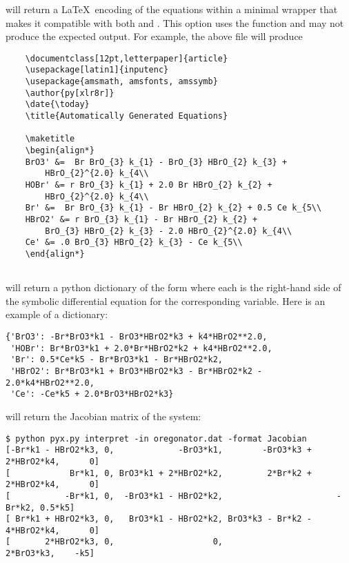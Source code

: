  will return a \LaTeX\ encoding of the equations within a minimal wrapper that makes it compatible with both  and . 
This option uses the  function and may not produce the expected output. 
For example, the above file will produce

\begin{lstlisting}
	\documentclass[12pt,letterpaper]{article}
	\usepackage[latin1]{inputenc}
	\usepackage{amsmath, amsfonts, amssymb}
	\author{py[xlr8r]}
	\date{\today}
	\title{Automatically Generated Equations}
	
	\maketitle
	\begin{align*}
	BrO3' &=  Br BrO_{3} k_{1} - BrO_{3} HBrO_{2} k_{3} + 
		HBrO_{2}^{2.0} k_{4\\
	HOBr' &= r BrO_{3} k_{1} + 2.0 Br HBrO_{2} k_{2} + 
		HBrO_{2}^{2.0} k_{4\\
	Br' &=  Br BrO_{3} k_{1} - Br HBrO_{2} k_{2} + 0.5 Ce k_{5\\
	HBrO2' &= r BrO_{3} k_{1} - Br HBrO_{2} k_{2} + 
		BrO_{3} HBrO_{2} k_{3} - 2.0 HBrO_{2}^{2.0} k_{4\\
	Ce' &= .0 BrO_{3} HBrO_{2} k_{3} - Ce k_{5\\
	\end{align*}
	
\end{lstlisting}

\clearpage

 will return a python dictionary of the form where each  is the right-hand side of the symbolic differential equation for the corresponding variable. Here is an example of a dictionary: 
\begin{lstlisting}
{'BrO3': -Br*BrO3*k1 - BrO3*HBrO2*k3 + k4*HBrO2**2.0, 
 'HOBr': Br*BrO3*k1 + 2.0*Br*HBrO2*k2 + k4*HBrO2**2.0, 
 'Br': 0.5*Ce*k5 - Br*BrO3*k1 - Br*HBrO2*k2, 
 'HBrO2': Br*BrO3*k1 + BrO3*HBrO2*k3 - Br*HBrO2*k2 - 2.0*k4*HBrO2**2.0, 
 'Ce': -Ce*k5 + 2.0*BrO3*HBrO2*k3}
\end{lstlisting}


 will return the Jacobian matrix of the system: 

\begin{lstlisting}[xleftmargin=0in, xrightmargin=0in]
$ python pyx.py interpret -in oregonator.dat -format Jacobian
[-Br*k1 - HBrO2*k3, 0,             -BrO3*k1,        -BrO3*k3 + 2*HBrO2*k4,      0]
[            Br*k1, 0, BrO3*k1 + 2*HBrO2*k2,         2*Br*k2 + 2*HBrO2*k4,      0]
[           -Br*k1, 0,  -BrO3*k1 - HBrO2*k2,                       -Br*k2, 0.5*k5]
[ Br*k1 + HBrO2*k3, 0,   BrO3*k1 - HBrO2*k2, BrO3*k3 - Br*k2 - 4*HBrO2*k4,      0]
[       2*HBrO2*k3, 0,                    0,                    2*BrO3*k3,    -k5]
\end{lstlisting}


